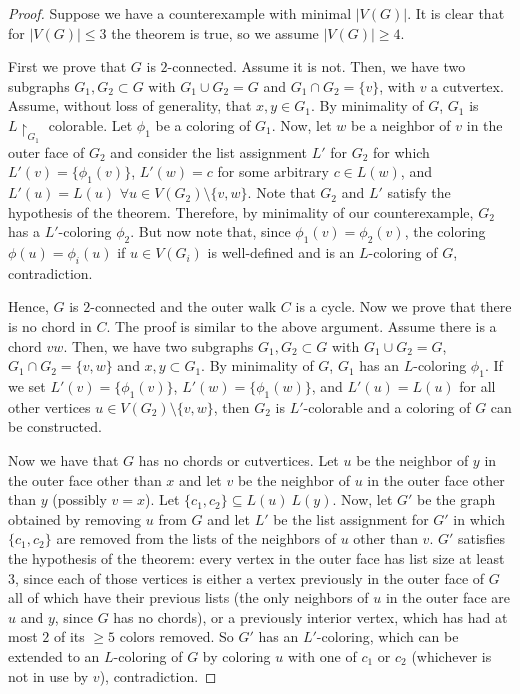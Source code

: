 \begin{proof}
Suppose we have a counterexample with minimal $|V(G)|$. It is clear that for 
$|V(G)| \leq 3$ the theorem is true, so we assume $|V(G)| \geq 4$.

First we prove that $G$ is $2$-connected. Assume it is not. Then, we have two subgraphs $G_1, G_2 \subset G$ with $G_1 \cup G_2 = G$ 
and $G_1 \cap G_2 = \{v\}$, with $v$ a cutvertex. Assume, without loss of generality, that $x, y \in G_1$. By minimality of $G$, 
$G_1$ is $L\restriction_{G_1}$ colorable. Let $\phi_1$ be a coloring of $G_1$. Now, let $w$ be a neighbor of $v$ in the outer face 
of $G_2$ and consider the list assignment $L'$ for $G_2$ for which $L'(v) = \{\phi_1(v)\}$, $L'(w) = c$ for some arbitrary 
$c \in L(w)$, and $L'(u) = L(u)$ $\forall u \in V(G_2) \setminus \{v, w\}$. Note that $G_2$ and $L'$ satisfy the hypothesis 
of the theorem. Therefore, by minimality of our counterexample, $G_2$ has a $L'$-coloring $\phi_2$. But now note that, since 
$\phi_1(v) = \phi_2(v)$, the coloring $\phi(u) = \phi_i(u)$ if $u \in V(G_i)$ is well-defined and is an $L$-coloring of $G$, 
contradiction.

Hence, $G$ is $2$-connected and the outer walk $C$ is a cycle. Now we prove that there is no chord in $C$. The proof is 
similar to the above argument. Assume there is a chord $vw$. Then, we have two subgraphs $G_1, G_2 \subset G$ with 
$G_1 \cup G_2 = G$, $G_1 \cap G_2 = \{v, w\}$ and ${x, y} \subset G_1$. By minimality of $G$, $G_1$ has an $L$-coloring $\phi_1$. 
If we set $L'(v) = \{\phi_1(v)\}$, $L'(w) = \{\phi_1(w)\}$, and $L'(u) = L(u)$ for all other vertices 
$u \in V(G_2) \setminus \{v, w\}$, then $G_2$ is $L'$-colorable and a coloring of $G$ can be constructed.

Now we have that $G$ has no chords or cutvertices. Let $u$ be the neighbor of $y$ in the outer face other than 
$x$ and let $v$ be the neighbor of $u$ in the outer face other than $y$ (possibly $v = x$). Let  
$\{c_1, c_2\} \subseteq L(u) \ L(y)$. Now, let $G'$ be the graph obtained by removing $u$ from $G$ and let $L'$ be 
the list assignment for $G'$ in which $\{c_1, c_2\}$ are removed from the lists of the neighbors of $u$ other than 
$v$. $G'$ satisfies the hypothesis of the theorem: every vertex in the outer face has list size at least $3$, since each of those
vertices is
either a vertex previously in the outer face of $G$ all of which have their previous lists (the only neighbors of $u$ in 
the outer face are $u$ and $y$, since $G$ has no chords), or a previously interior vertex, which has had at most $2$ of its
$\geq 5$ colors removed. So $G'$ has an $L'$-coloring, which can be extended to an $L$-coloring of $G$ by coloring $u$ with one
of $c_1$ or $c_2$ (whichever is not in use by $v$), contradiction.



\end{proof}

